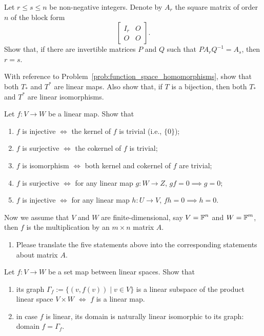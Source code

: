 \begin{problem}
Let $r \leq s \leq n$ be non-negative integers. Denote by $A_r$ the square matrix of order $n$ of the block form
\[ \begin{bmatrix} I_r & O \\ O & O \end{bmatrix}. \]
Show that, if there are invertible matrices $P$ and $Q$ such that $P A_r Q^{-1} = A_s$, then $r = s$.
\end{problem}

\begin{problem}
With reference to Problem~\ref{prob:function_space_homomorphisms}, show that both $T_*$ and $T^*$ are linear maps. Also show that, if $T$ is a bijection, then both $T_*$ and $T^*$ are linear isomorphisms.
\end{problem}

\begin{problem}
Let $f \colon V \to W$ be a linear map. Show that
\begin{enumerate}
  \item $f$ is injective $\iff$ the kernel of $f$ is trivial (i.e., $\{0\}$);
  \item $f$ is surjective $\iff$ the cokernel of $f$ is trivial;
  \item $f$ is isomorphism $\iff$ both kernel and cokernel of $f$ are trivial;
  \item $f$ is surjective $\iff$ for any linear map $g \colon W \to Z$, $gf = 0 \implies g = 0$;
  \item $f$ is injective $\iff$ for any linear map $h \colon U \to V$, $fh = 0 \implies h = 0$.
\end{enumerate}
Now we assume that $V$ and $W$ are finite-dimensional, say $V = \operatorname{\mathbb{F}}^n$ and $W = \operatorname{\mathbb{F}}^m$, then $f$ is the multiplication by an $m \times n$ matrix $A$.
\begin{enumerate}[resume]
  \item Please translate the five statements above into the corresponding statements about matrix $A$.
\end{enumerate}
\end{problem}

\begin{problem}
Let $f \colon V \to W$ be a set map between linear spaces. Show that
\begin{enumerate}
  \item its graph $\Gamma_f := \{(v, f(v)) \mid v \in V\}$ is a linear subspace of the product linear space $V \times W$ $\iff$ $f$ is a linear map.
  \item in case $f$ is linear, its domain is naturally linear isomorphic to its graph: domain $f = \Gamma_f$.
\end{enumerate}
\end{problem}

